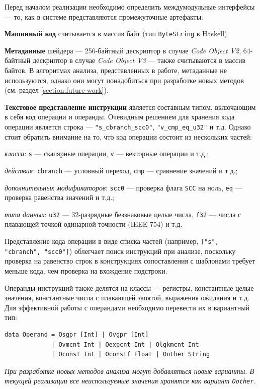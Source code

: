 \documentclass[a4paper,14pt]{extarticle}
\begin{document}
{Перед началом реализации необходимо определить междумодульные интерфейсы —
то, как в системе представляются промежуточные артефакты:

\begin{ol}
\item \textbf{Машинный код} считывается в массив байт (тип \verb|ByteString| в Haskell).
\item \textbf{Метаданные} шейдера — 256-байтный дескриптор в случае \textit{Code Object V2},
64-байтный дескриптор в случае \textit{Code Object V3} — также считываются в массив байтов. %
В алгоритмах анализа, представленных в работе, метаданные не используются, однако они
могут понадобиться при разработке новых методов (см. раздел \ref{section:future-work}).
\item \textbf{Текстовое представление инструкции} является составным типом, включающим
в себя код операции и операнды. Очевидным решением для хранения кода операции
является строка — \verb|"s_cbranch_scc0"|, \verb|"v_cmp_eq_u32"| и т.д. Однако
стоит обратить внимание на то, что код операции состоит из нескольких частей:
\begin{ul}
\item \textit{класса}: \verb|s| — скалярные операции, \verb|v| — векторные операции и т.д.;
\item \textit{действия}: \verb|cbranch| — условный переход, \verb|cmp| — сравнение значений и т.д.;
\item \textit{дополнительных модификаторов}: \verb|scc0| — проверка флага \verb|SCC| на ноль,
\verb|eq| — проверка равенства значений и т.д.;
\item \textit{типа данных}: \verb|u32| — 32-разрядные беззнаковые целые числа, \verb|f32| —
числа с плавающей точкой одинарной точности (IEEE 754) и т.д.
\end{ul}
Представление кода операции в виде списка частей (например, \verb|["s", "cbranch", "scc0"]|)
облегчает поиск инструкций при анализе, поскольку проверка на равенство строк в конструкциях
сопоставления с шаблонами требует меньше кода, чем проверка на вхождение подстроки.

Операнды инструкций также делятся на классы — регистры, константные целые значения, константные
числа с плавающей запятой, выражения ожидания и т.д. Для эффективной работы с операндами
необходимо перевести их в вариантный тип:
\begin{verbatim}
data Operand = Osgpr [Int] | Ovgpr [Int]
             | Ovmcnt Int | Oexpcnt Int | Olgkmcnt Int
             | Oconst Int | Oconstf Float | Oother String
\end{verbatim}
\textit{При разработке новых методов анализа могут добавляться новые варианты. В текущей реализации
все неиспользуемые значения хранятся как вариант \texttt{Oother}.}


\end{ol}}
\end{document}
